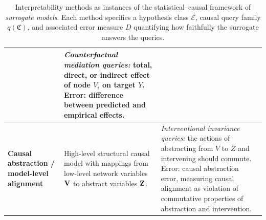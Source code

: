 \begin{table}[ht]
\begin{tabular}{@{}p{3.2cm}p{5.1cm}p{5.1cm}@{}}
& \textit{Counterfactual mediation queries:} total, direct, or indirect effect of node $V_i$ on target $Y$.  
Error: difference between predicted and empirical effects. \\ 
\midrule
\textbf{Causal abstraction / model-level alignment} 
& High-level structural causal model with mappings from low-level network variables $\mathbf{V}$ to abstract variables $\mathbf{Z}$.  
& \textit{Interventional invariance queries:} the actions of abstracting from $V$ to $Z$ and intervening should commute.
Error: causal abstraction error, measuring causal alignment as violation of commutative properties of abstraction and intervention. \\ 
\bottomrule
\end{tabular}
\caption{Interpretability methods as instances of the statistical--causal framework of \emph{surrogate models}. Each method specifies a hypothesis class $\mathcal{E}$, causal query family $q(\mathfrak{C})$, and associated error measure $D$ quantifying how faithfully the surrogate answers the queries.}
\label{tab:interpretability_methods}
\end{table}